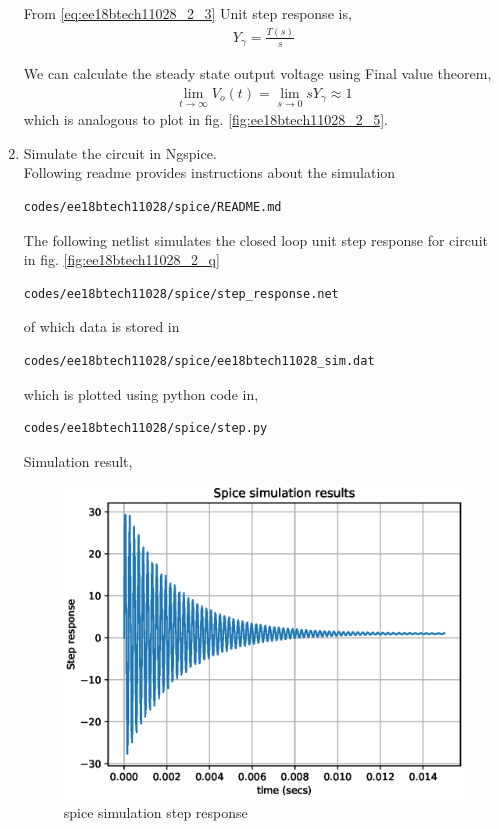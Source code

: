 \begin{enumerate}[label=\arabic*.,ref=\theenumi]
From \eqref{eq:ee18btech11028_2_3} Unit step response is,
\begin{align}
    Y_{\gamma} = \frac{T(s)}{s}
\end{align}

We can calculate the steady state output voltage using Final value theorem,
\begin{align}
    \lim_{t\to\infty} V_{o}(t) = \lim_{s \to 0} sY_{\gamma} \approx 1
\end{align}
which is analogous to plot in fig. \ref{fig:ee18btech11028_2_5}.
\item Simulate the circuit in Ngspice.
\\
\solution Following readme provides instructions about the simulation

\begin{lstlisting}
codes/ee18btech11028/spice/README.md
\end{lstlisting}

The following netlist simulates the closed loop unit step response for circuit in fig. \ref{fig:ee18btech11028_2_q}
\begin{lstlisting}
codes/ee18btech11028/spice/step_response.net
\end{lstlisting}
of which data is stored in 
\begin{lstlisting}
codes/ee18btech11028/spice/ee18btech11028_sim.dat
\end{lstlisting}
which is plotted using python code in,
\begin{lstlisting}
codes/ee18btech11028/spice/step.py
\end{lstlisting}
Simulation result,
\begin{figure}[!ht]
    \centering
    \includegraphics[width=\columnwidth]{./figs/ee18btech11028/spice_step_response.eps}
    \caption{spice simulation step response}
    \label{fig:ee18btech11028_2_6}
\end{figure}


\end{enumerate}
